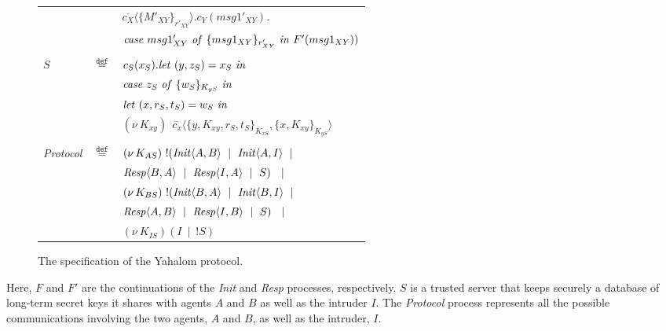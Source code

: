\documentclass[10pt,a4paper,final,oneside,fleqn]{book}
\newcommand*{\eqdef}{\mathbin{\mathop{=}\limits^{\texttt{def}}}}
\begin{document}
\begin{figure}[!tbp]
\begin{center}
\begin{tabular}{|lll|}
&&$\overline{c_{X}}\langle\{M'_{XY}\}_{r'_{XY}}\rangle.c_{Y}(msg1'_{XY}).$\\
&&$\mbox{{\itshape case\/} }msg1'_{XY}\mbox{ {\itshape of\/} }\{msg1_{XY}\}_{r'_{XY}}\mbox{ {\itshape in\/} }F'(msg1_{XY}))$\\&&\\
$S$&$\eqdef$&$c_{S}(x_{S}).\mbox{{\itshape let\/} }(y,z_{S})=x_{S}\mbox{ {\itshape in\/}}$\\
&&$\mbox{{\itshape case\/} }z_{S}\mbox{ {\itshape of\/} }\{w_{S}\}_{K_{yS}}\mbox{ {\itshape in\/}}$\\
&&$\mbox{{\itshape let\/} }(x,r_{S},t_{S})=w_{S}\mbox{ {\itshape in\/}}$\\
&&$(\nu~\!K_{xy})~~\overline{c_{x}}\langle\{y,K_{xy},r_{S},t_{S}\}_{K_{xS}},\{x,K_{xy}\}_{K_{yS}}\rangle$\\&&\\
{\itshape Protocol\/}&$\eqdef$&$(\nu~\!K_{AS})~!(\mbox{{\itshape Init\/}}\langle A,B\rangle~\mid~\mbox{{\itshape Init\/}}\langle A,I\rangle~\mid$\\
&&\hspace{13mm}$\mbox{{\itshape Resp\/}}\langle B,A\rangle~\mid~\mbox{{\itshape Resp\/}}\langle I,A\rangle~\mid~S)~~\mid$\\
&&$(\nu~\!K_{BS})~!(\mbox{{\itshape Init\/}}\langle B,A\rangle~\mid~\mbox{{\itshape Init\/}}\langle B,I\rangle~\mid$\\
&&\hspace{13mm}$\mbox{{\itshape Resp\/}}\langle A,B\rangle~\mid~\mbox{{\itshape Resp\/}}\langle I,B\rangle~\mid~S)~~\mid$\\
&&$(\nu~\!K_{IS})(I~\mid~!S)$\\
\hline
\end{tabular}
\end{center}
\caption{The specification of the Yahalom protocol.\label{yahalom}}
\end{figure}
\noindent
Here, $F$ and $F'$ are the continuations of the {\itshape Init\/} and {\itshape Resp\/} processes, respectively.  $S$ is a trusted server that keeps securely a database of long-term secret keys it shares with agents $A$ and $B$ as well as the intruder $I$.  The {\itshape Protocol\/} process represents all the possible communications involving the two agents, $A$ and $B$, as well as the intruder, $I$.
\end{document}
